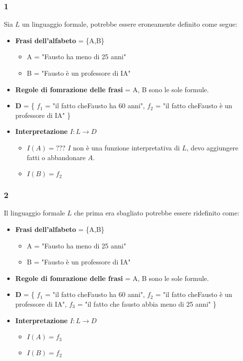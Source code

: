 \documentclass{book}
\begin{document}
    \subsubsection{1}
    Sia $L$ un linguaggio formale, potrebbe essere eroneamente definito come segue:
    \begin{itemize}
        \item \textbf{Frasi dell'alfabeto} = \{A,B\}
        \begin{itemize}
            \item A = "Fausto ha meno di 25 anni"
            \item B = "Fausto è un professore di IA"
        \end{itemize}
        \item \textbf{Regole di fomrazione delle frasi} = A, B sono le sole formule.
        \item \textbf{D} = \{ $f_1$ = "il fatto cheFausto ha 60 anni", $f_2$ = "il fatto cheFausto è un professore di IA" \}
        \item \textbf{Interpretazione} $I:L \to D$
        \begin{itemize}
            \item $I(A)=???$ $I$ non è una funzione interpretativa di $L$, devo aggiungere fatti o abbandonare $A$.
            \item $I(B)=f_2$
        \end{itemize}
    \end{itemize}

    \subsubsection{2}
    Il linguaggio formale $L$ che prima era sbagliato potrebbe essere ridefinito come:
    \begin{itemize}
        \item \textbf{Frasi dell'alfabeto} = \{A,B\}
        \begin{itemize}
            \item A = "Fausto ha meno di 25 anni"
            \item B = "Fausto è un professore di IA"
        \end{itemize}
        \item \textbf{Regole di fomrazione delle frasi} = A, B sono le sole formule.
        \item \textbf{D} = \{ $f_1$ = "il fatto cheFausto ha 60 anni", $f_2$ = "il fatto cheFausto è un professore di IA", $f_3$ = "il fatto che fausto abbia meno di 25 anni" \}
        \item \textbf{Interpretazione} $I:L \to D$
        \begin{itemize}
            \item $I(A)=f_3$
            \item $I(B)=f_2$
        \end{itemize}
    \end{itemize}
\end{document}
